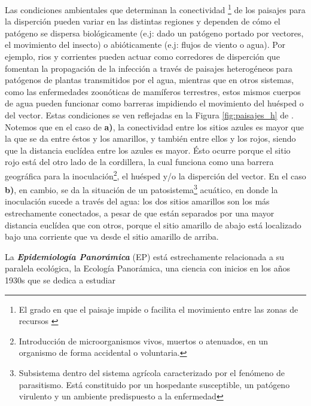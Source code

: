 \par Las condiciones ambientales que determinan la
  conectividad \footnote{El grado en que el paisaje impide o facilita el movimiento
  entre las zonas de recursos \cite{landscape_connectivity}} de los paisajes
  para la disperción pueden variar en las distintas regiones y dependen de cómo
  el patógeno se dispersa biológicamente (e.j: dado un patógeno portado por
  vectores, el movimiento del insecto) o abióticamente (e.j: flujos de viento o agua).
  Por ejemplo, rios y corrientes pueden actuar como corredores de disperción que
  fomentan la propagación de la infección a través de paisajes heterogéneos
  para patógenos de plantas transmitidos por el agua, mientras que en otros
  sistemas, como las enfermedades zoonóticas de mamíferos terrestres, estos mismos
  cuerpos de agua pueden funcionar como barreras impidiendo el movimiento
  del huésped o del vector. Estas condiciones se ven reflejadas en la
  Figura \ref{fig:paisajes_h} de \cite{landscape_epidemiology}.
  Notemos que en el caso de \textbf{a)}, la
  conectividad entre los sitios azules es mayor que la que se da entre éstos y
  los amarillos, y también entre ellos y los rojos, siendo que la distancia
  euclídea entre los azules es mayor. Ésto ocurre porque el sitio rojo está del otro lado
  de la cordillera, la cual funciona como una barrera geográfica para la
  inoculación\footnote{Introducción de microorganismos vivos, muertos o atenuados,
  en un organismo de forma accidental o voluntaria.}, el huésped y/o la disperción
  del vector. En el caso \textbf{b)}, en cambio, se da la situación de un
  patosistema\footnote{Subsistema dentro del sistema agrícola caracterizado por el
  fenómeno de parasitismo. Está constituido por un hospedante susceptible,
  un patógeno virulento y un ambiente predispuesto a la enfermedad} acuático, en
  donde la inoculación sucede a través del agua: los dos sitios amarillos son los
  más estrechamente conectados, a pesar de que están separados por una mayor
  distancia euclídea que con otros, porque el sitio amarillo de abajo está localizado
  bajo una corriente que va desde el sitio amarillo de arriba.
  \par La \textbf{\textit{Epidemiología Panorámica}}\cite{nidality, ostfeld_re_emerging}
  (EP) está estrechamente relacionada a su paralela ecológica, la Ecología
  Panorámica, una ciencia con inicios en los años 1930s que se dedica a estudiar

